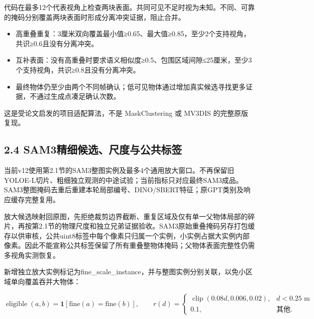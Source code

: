 \documentclass[UTF8,fontset=fandol]{ctexart}
\begin{document}
代码在最多12个代表视角上检查两块表面。共同可见不足时视为未知。不同、可靠的掩码分别覆盖两块表面时形成分离冲突证据，阻止合并。



\begin{itemize}
\item 高重叠重复：3厘米双向覆盖最小值≥0.65、最大值≥0.85，至少2个支持视角，共识≥0.6且没有分离冲突。


\item 互补表面：没有高重叠时要求语义相似度≥0.5、包围区域间隙≤25厘米，至少3个支持视角，共识≥0.8且没有分离冲突。


\item 最终物体仍至少由两个不同帧确认；低可见物体通过增加真实候选寻找更多证据，不通过生成点凑足确认次数。

\end{itemize}


这是受论文启发的项目适配算法，不是 MaskClustering 或 MV3DIS 的完整原版复现。



\subsection*{2.4 SAM3精细候选、尺度与公共标签}

当前v12使用第2.1节的SAM3整图实例及最多4个通用放大窗口。不再保留旧YOLOE-L切片、粗细独立观测的中途试验；当前指标只对应最终SAM3成品。SAM3整图掩码去重后重建本轮局部编号、DINO/SBERT特征；原GPT类别及响应缓存完整复用。



放大候选映射回原图，先拒绝裁剪边界截断、重复区域及仅有单一父物体局部的碎片，再按第2.1节的物理尺度和独立兄弟证据验收。SAM3原始重叠掩码另存打包缓存以供审核，公共uint8标签中每个像素只归属一个实例，小实例占据大实例内部像素。因此不能宣称公共标签保留了所有重叠整物体掩码；父物体表面完整性仍需多视角实测恢复。



新增独立放大实例标记为fine\_scale\_instance，并与整图实例分别关联，以免小区域单向覆盖吞并大物体：



\[
\operatorname{eligible}(a,b)=\mathbf1[\mathrm{fine}(a)=\mathrm{fine}(b)],\qquad
r(d)=\begin{cases}\operatorname{clip}(0.08d,0.006,0.02),&d<0.25\text{ m}\\0.1,&\text{其他}.\end{cases}
\]
\end{document}
